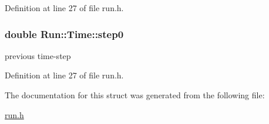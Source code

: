 Definition at line 27 of file run.h.\hypertarget{structRun_1_1Time_f061d3f8babfe196d06003e34bc23b42}{
\subsubsection[{step0}]{\setlength{\rightskip}{0pt plus 5cm}double {\bf Run::Time::step0}}}
\label{structRun_1_1Time_f061d3f8babfe196d06003e34bc23b42}


previous time-step 



Definition at line 27 of file run.h.

The documentation for this struct was generated from the following file:\begin{CompactItemize}
\item 
\hyperlink{run_8h}{run.h}\end{CompactItemize}
